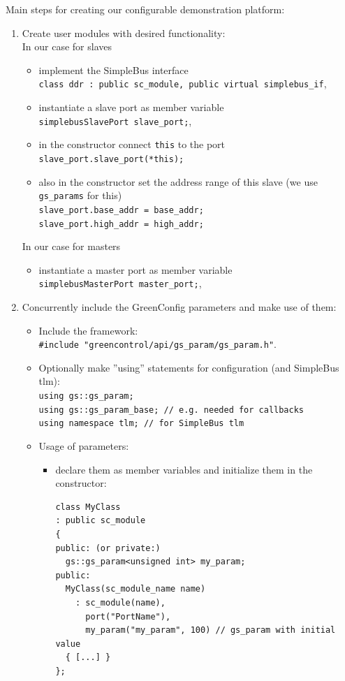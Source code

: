 \begin{samepage}
Main steps for creating our configurable demonstration platform:

\begin{enumerate}

	\item Create user modules with desired functionality:\\
	In our case for slaves
	\begin{itemize}
		\item implement the SimpleBus interface \\ \lstinline|class ddr : public sc_module, public virtual simplebus_if|,
		\item instantiate a slave port as member variable \\ \lstinline|simplebusSlavePort slave_port;|,
		\item in the constructor connect \lstinline|this| to the port \\ \lstinline|slave_port.slave_port(*this);|
		\item also in the constructor set the address range of this slave (we use \lstinline|gs_params| for this) \\ 
		\lstinline|slave_port.base_addr = base_addr;|\\
    \lstinline|slave_port.high_addr = high_addr;|
	\end{itemize}
	In our case for masters
	\begin{itemize}
		\item instantiate a master port as member variable \\ \lstinline|simplebusMasterPort master_port;|,
	\end{itemize}

 	\item Concurrently include the GreenConfig parameters and make use of them:
	\begin{itemize}
		\item Include the framework: \\ \lstinline|#include "greencontrol/api/gs_param/gs_param.h"|.
		\item Optionally make ''using'' statements for configuration (and SimpleBus tlm): \\ 
		  \lstinline|using gs::gs_param;|\\
		\lstinline|using gs::gs_param_base; // e.g. needed for callbacks| \\
		\lstinline|using namespace tlm; // for SimpleBus tlm|
		\item Usage of parameters:
		\begin{itemize}
			\item declare them as member variables and initialize them in the constructor:
\begin{lstlisting}
class MyClass
: public sc_module
{
public: (or private:)
  gs::gs_param<unsigned int> my_param;
public:
  MyClass(sc_module_name name)
    : sc_module(name),
      port("PortName"),
      my_param("my_param", 100) // gs_param with initial value
  { [...] }
};
\end{lstlisting}


\end{itemize}
\end{itemize}
\end{enumerate}
\end{samepage}
